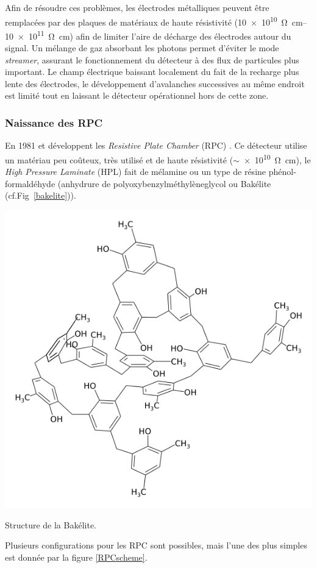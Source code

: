 Afin de résoudre ces problèmes, les électrodes métalliques peuvent être remplacées par des plaques de matériaux de haute résistivité (\SIrange{10e10}{10e11}{\ohm\centi\meter}) afin de limiter l'aire de décharge des électrodes autour du signal. Un mélange de gaz absorbant les photons permet d'éviter le mode \textit{streamer}, assurant le fonctionnement du détecteur à des flux de particules plus important. Le champ électrique baissant localement du fait de la recharge plus lente des électrodes, le développement d'avalanches successives au même endroit est limité tout en laissant le détecteur opérationnel hors de cette zone.
\vspace{-0.4cm}
\subsubsection{Naissance des RPC}
\vspace{-0.4cm}
En \num{1981}  et  développent les \textit{Resistive Plate Chamber} (RPC) \cite{Santonico:1981sc} \cite{CARDARELLI198820}. Ce détecteur utilise un matériau peu coûteux, très utilisé et de haute résistivité ($\sim$\SI{e10}{\ohm\centi\meter}), le \textit{High Pressure Laminate} (HPL) fait de mélamine ou un type de résine phénol-formaldéhyde (anhydrure de polyoxybenzylméthylèneglycol ou Bakélite (cf.Fig~\ref{bakelite})). 
\marginpar
{
	\centering
	\includegraphics[width=\marginparwidth]{RPC/bakelite.png}
	\captionsetup{type=subfigure}\caption{Structure de la Bakélite.}
	\label{bakelite}
}
Plusieurs configurations pour les RPC sont possibles, mais l'une des plus simples est donnée par la figure \ref{RPCscheme}.


